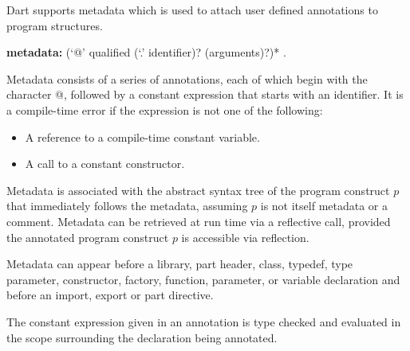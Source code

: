 \documentclass{article}
\begin{document}
\LMHash{}
Dart supports metadata which is used to attach user defined annotations to program structures.

\begin{grammar}
{\bf metadata:}
      (`@' qualified ({\escapegrammar `.'} identifier)? (arguments)?)*
    .
\end{grammar}

\LMHash{}
Metadata consists of a series of annotations, each of which begin with the character @, followed by  a constant expression that starts with an identifier. It is a compile-time error if the expression is not one of the following:
\begin{itemize}
\item A reference to a compile-time constant variable.
\item A call to a constant constructor.
\end{itemize}

\LMHash{}
Metadata is associated with the abstract syntax tree of the program construct $p$ that immediately follows the metadata, assuming $p$ is not itself metadata or a comment. Metadata can be retrieved at run time via a reflective call, provided the annotated program construct $p$ is accessible via reflection.




\LMHash{}
Metadata can appear before a library, part header, class, typedef, type parameter, constructor, factory, function, parameter, or variable declaration and before an import, export or part directive.

\LMHash{}
The constant expression given in an annotation  is type checked and evaluated in the scope surrounding the declaration being annotated.
\end{document}
